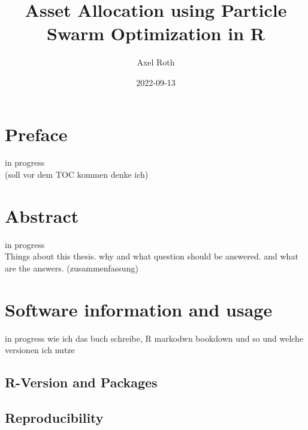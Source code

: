 \documentclass[
  oneside]{book}
\title{Asset Allocation using Particle Swarm Optimization in R}
\author{Axel Roth}
\date{2022-09-13}
\begin{document}
\maketitle

{
\setcounter{tocdepth}{1}
\tableofcontents
}
\hypertarget{preface}{%
\chapter*{Preface}\label{preface}}

\renewcommand{\chaptermark}[1]{\markboth{\uppercase{#1}}{\uppercase{#1}}}

\textbar\textbar\textbar in progress\textbar\textbar\textbar{}\\
(soll vor dem TOC kommen denke ich)

\renewcommand{\chaptermark}[1]{\markboth{\uppercase{\thechapter. \ #1}}{}}

\hypertarget{abstract}{%
\chapter{Abstract}\label{abstract}}

\textbar\textbar\textbar in progress\textbar\textbar\textbar{}\\
Things about this thesis. why and what question should be answered. and what are the answers. (zusammenfassung)

\hypertarget{software-information-and-usage}{%
\chapter{Software information and usage}\label{software-information-and-usage}}

\textbar\textbar\textbar in progress\textbar\textbar\textbar{}
wie ich das buch schreibe, R markodwn bookdown und so und welche versionen ich nutze

\hypertarget{r-version-and-packages}{%
\section{R-Version and Packages}\label{r-version-and-packages}}

\hypertarget{reproducibility}{%
\section{Reproducibility}\label{reproducibility}}
\end{document}
